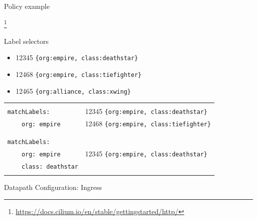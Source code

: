 \documentclass[black,white]{beamer}
\newcommand\blfootnote[1]{%
  \begingroup
  \renewcommand\thefootnote{}\footnote{#1}%
  \addtocounter{footnote}{-1}%
  \endgroup
}
\DeclareRobustCommand{\#}{\adjustbox{valign=B,totalheight=.57\baselineskip}{\oldhash}}%
\begin{document}
    \begin{frame}{Policy example}
        
        \blfootnote{\tiny \url{https://docs.cilium.io/en/stable/gettingstarted/http/}}
    \end{frame}

    \begin{frame}[fragile]{Label selectors}
        \vfill
        \begin{itemize}
            \item 12345 \verb+{org:empire, class:deathstar}+ \smallskip
            \item 12468 \verb+{org:empire, class:tiefighter}+ \smallskip
            \item 12465 \verb+{org:alliance, class:xwing}+ \smallskip
        \end{itemize}
        \vfill
        \begin{tabularx}{\textwidth}{l|l}
            \hline
            & \\
            \verb+matchLabels:+ & 12345 \verb+{org:empire, class:deathstar}+ \\
            \verb+    org: empire+ & 12468 \verb+{org:empire, class:tiefighter}+ \\
            & \\
            \hline
            & \\
            \verb+matchLabels:+ & \\
            \verb+    org: empire+ & 12345 \verb+{org:empire, class:deathstar}+ \\
            \verb+    class: deathstar+ & \\
            & \\
            \hline
        \end{tabularx}
        \vfill
    \end{frame}

    \begin{frame}{Datapath Configuration: Ingress}
        \vfill
        \begin{figure}
            
        \end{figure}
        \vfill
    \end{frame}
\end{document}
